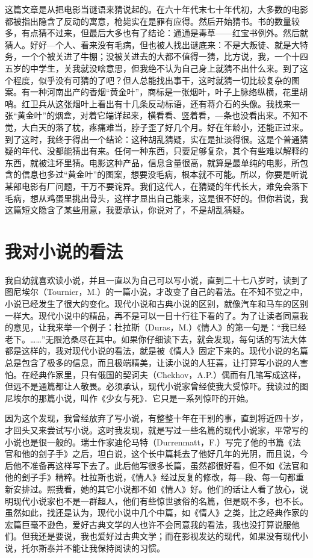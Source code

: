 这篇文章是从把电影当谜语来猜说起的。在六十年代末七十年代初，大多数的电影都被指出隐含了反动的寓意，枪毙实在是罪有应得。然后开始猜书。书的数量较多，有点猜不过来，但最后大多也有了结论：通通是毒草——红宝书例外。然后就猜人。好好—个人、看来没有毛病，但也被人找出谜底来：不是大叛徒、就是大特务，一个个被关进了牛棚；没被关进去的大都不值得一猜，比方说，我，一个十四五岁的中学生，关我就没啥意思，但我绝不认为自己身上就猜不出什么来。到了这个程度，似乎没有可猜的了吧？但人总能找出事干，这时就猜一切比较复杂的图案。有一种河南出产的香烟“黄金叶”，商标是一张烟叶，叶子上脉络纵横，花里胡哨。红卫兵从这张烟叶上看出有十几条反动标语，还有蒋介石的头像。我找来一张“黄金叶”的烟盒，对着它端详起来，横看看、竖着看，—条也没看出来。不知不觉，大白天的落了枕，疼痛难当，脖子歪了好几个月。好在年龄小，还能正过来。到了这时，我终于得出一个结论：这种胡乱猜疑，实在是扯淡得很。这是个普通猜疑的年代、没都能猜出有来。任何一种东西，只要足够复杂，其个有些难以解释的东西，就被注坏里猜。电影这种产品，信息含量很高，就算是最单纯的电影，所包含的信息也多过“黄金叶”的图案，想要没毛病，根本就不可能。所以，你要是听说某部电影有厂问题，干万不要诧异。我们这代人，在猜疑的年代长大，难免会落下毛病，想从鸡蛋里挑出骨头，这样才显出自己能来，这是很不好的。但你若说，我这篇短文隐含了某些用意，我要承认，你说对了，不是胡乱猜疑。
 
\chapter{我对小说的看法}

我自幼就喜欢读小说，并且一直以为自己可以写小说，直到二十七八岁时，读到了图尼埃尔（Tournier，M.）的一篇小说，才改变了自己的看法。在不知不觉之中，小说已经发生了很大的变化。现代小说和古典小说的区别，就像汽车和马车的区别一样大。现代小说中的精品，再不是可以一目十行往下看的了。为了让读者同意我的意见，让我来举一个例子：杜拉斯（Duras，M.）《情人》的第一句是：“我已经老下。……”无限沧桑尽在其中。如果你仔细读下去，就会发现，每句话的写法大体都是这样的，我对现代小说的看法，就是被《情人》固定下来的。现代小说的名篇总是包含了极多的信息，而且极端精美，让读小说的人狂喜，让打算写小说的人害怕。在经典作家里，只有俄国的契诃夫（Chekhov，A.P.）偶而有几笔写成这样，但远不是通篇都让人敬畏。必须承认，现代小说家曾经使我大受惊吓。我读过的图尼埃尔的那篇小说，叫作《少女与死》．它只是一系列惊吓的开始。 

因为这个发现，我曾经放弃了写小说，有整整十年在干别的事，直到将近四十岁，才回头又来尝试写小说。这时我发现，就是写过一些名篇的现代小说家，平常写的小说也是很一般的。瑞士作家迪伦马特（Durrenmatt，F.）写完了他的书篇《法官和他的刽子手》之后，坦白说，这个长中篇耗去了他好几年的光阴，而且说，今后他不准备再这样写下去了。此后他写很多长篇，虽然都很好看，但不如《法官和他的刽子手》精粹。杜拉斯也说，《情人》经过反复的修改，每—段、每一句都重新安排过。照我看，她的其它小说都不如《情人》好。他们的话让人看了放心，说明现代小说家也不是一群超人，他们有些惊世骇俗的名篇，但是既不多，也不长。虽然如此，找还是认为，现代小说中几个中篇，如《情人》之类，比之经典作家的宏篇巨毫不逊色，爱好古典文学的人也许不会同意我的看法，我也没打算说服他们。但我还是要说，我也爱好过古典文学；而在影视发达的现代，如果没有现代小说，托尔斯泰并不能让我保持阅读的习惯。 

